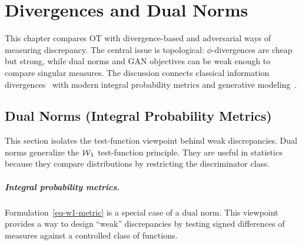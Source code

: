 \chapter{Divergences and Dual Norms}

\label{sec-divergences-dual-norms}


This chapter compares OT with divergence-based and adversarial ways of measuring discrepancy. The central issue is topological: $\phi$-divergences are cheap but strong, while dual norms and GAN objectives can be weak enough to compare singular measures. The discussion connects classical information divergences~\cite{ciszar1967information,ali1966general} with modern integral probability metrics and generative modeling~\cite{sriperumbudur2009integral,GAN,WassersteinGAN}.

\section{Dual Norms (Integral Probability Metrics)}
\label{sec-dual-norms}

This section isolates the test-function viewpoint behind weak discrepancies. Dual norms generalize the $\operatorname{\mathcal{W}}_1$ test-function principle. They are useful in statistics because they compare distributions by restricting the discriminator class.

\paragraph{Integral probability metrics.}

Formulation~\eqref{eq-w1-metric} is a special case of a dual norm. This viewpoint provides a way to design ``weak'' discrepancies by testing signed differences of measures against a controlled class of functions.


